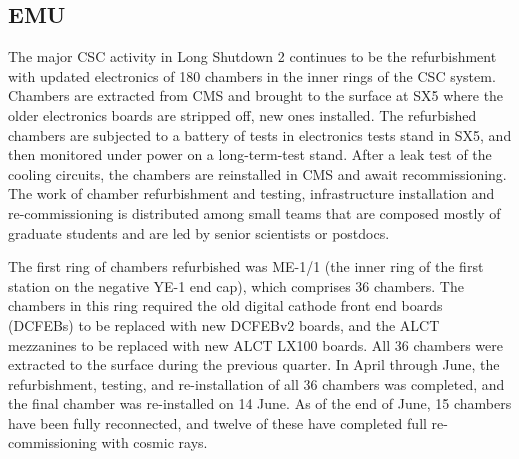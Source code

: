 \documentclass[12pt]{article}
\begin{document}
\noindent

\vfill






\subsection{EMU }


The major CSC activity in Long Shutdown 2 continues to be the refurbishment with updated electronics of 180 chambers in the inner rings of the CSC system.  Chambers are extracted from CMS and brought to the surface at SX5 where the older electronics boards are stripped off, new ones installed.  The refurbished chambers are subjected to a battery of  tests in electronics tests stand in SX5, and then monitored under power on a long-term-test stand.  After a leak test of the cooling circuits, the chambers are reinstalled in CMS and await recommissioning.   The work of chamber refurbishment and testing, infrastructure installation and re-commissioning is distributed among small teams that are composed mostly of graduate students and are led by senior scientists or postdocs. 

The first ring of chambers refurbished was ME-1/1 (the inner ring of the first station on the negative YE-1 end cap), which comprises 36 chambers. The chambers in this ring required the old digital cathode front end boards (DCFEBs) to be replaced with new DCFEBv2 boards, and the ALCT mezzanines to be replaced with new ALCT LX100 boards.   All 36 chambers were extracted to the surface during the previous quarter.  In April through June, the refurbishment, testing, and re-installation of all 36 chambers was completed, and the final chamber was re-installed on 14 June. As of the end of June, 15 chambers have been fully reconnected, and twelve of these have completed full re-commissioning with cosmic rays. 
\end{document}

